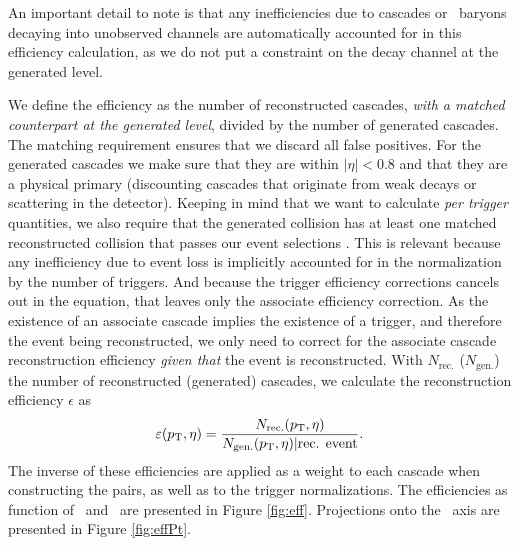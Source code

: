    An important detail to note is that any inefficiencies due to cascades or \Lambda\ baryons decaying into unobserved channels are automatically accounted for in this efficiency calculation, as we do not put a constraint on the decay channel at the generated level. 

    We define the efficiency as the number of reconstructed cascades, \textit{with a matched counterpart at the generated level}, divided by the number of generated cascades. The matching requirement ensures that we discard all false positives. For the generated cascades we make sure that they are within $|\eta| < 0.8$ and that they are a physical primary (discounting cascades that originate from weak decays or scattering in the detector). Keeping in mind that we want to calculate \textit{per trigger} quantities, we also require that the generated collision has at least one matched reconstructed collision that passes our event selections . This is relevant because any inefficiency due to event loss is implicitly accounted for in the normalization by the number of triggers. 
    And because the trigger efficiency corrections cancels out in the equation, that leaves only the associate efficiency correction. As the existence of an associate cascade implies the existence of a trigger, and therefore the event being reconstructed, we only need to correct for the associate cascade reconstruction efficiency \textit{given that} the event is reconstructed.
    With $N_\text{rec.}$ ($N_\text{gen.}$) the number of reconstructed (generated) cascades, we calculate the reconstruction efficiency $\epsilon$ as
    \begin{align}
      \epsilon(\pt, \eta) = \frac{N_\text{rec.}(\pt, \eta)}{N_\text{gen.}(\pt, \eta) | \text{rec. event}}. \label{eq:efficiency}
    \end{align}
    The inverse of these efficiencies are applied as a weight to each cascade when constructing the pairs, as well as to the trigger normalizations. The efficiencies as function of \pt\ and \eta\ are presented in Figure \ref{fig:eff}. Projections onto the \pt\ axis are presented in Figure \ref{fig:effPt}. 

